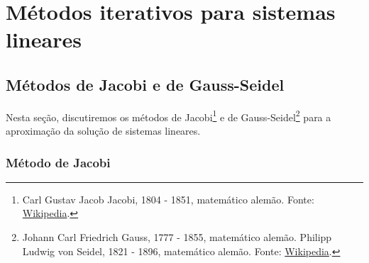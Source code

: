 
\chapter{Métodos iterativos para sistemas lineares}\label{cap_sl_iter}
\thispagestyle{fancy}

\section{Métodos de Jacobi e de Gauss-Seidel}\label{cap_sl_iter_sec_jgs}

Nesta seção, discutiremos os métodos de Jacobi\footnote{Carl Gustav Jacob Jacobi, 1804 - 1851, matemático alemão. Fonte: \href{https://en.wikipedia.org/wiki/Carl_Gustav_Jacob_Jacobi}{Wikipedia}.} e de Gauss-Seidel\footnote{Johann Carl Friedrich Gauss, 1777 - 1855, matemático alemão. Philipp Ludwig von Seidel, 1821 - 1896, matemático alemão. Fonte: \href{https://en.wikipedia.org/wiki/Philipp_Ludwig_von_Seidel}{Wikipedia}.} para a aproximação da solução de sistemas lineares.

\subsection{Método de Jacobi}

